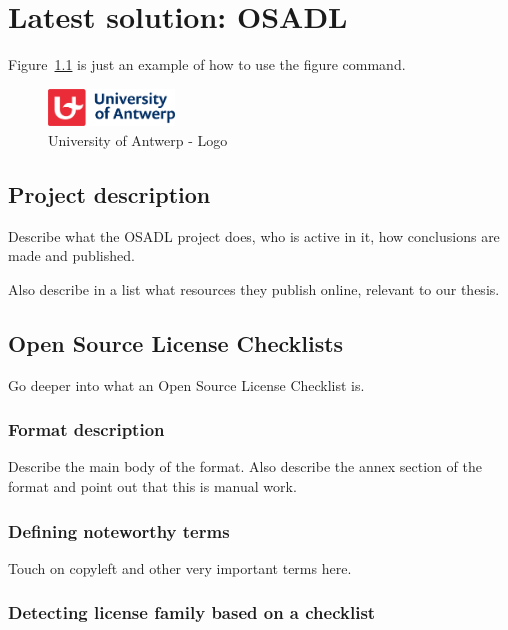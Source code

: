 
\chapter{Latest solution: OSADL}\label{ch:related-work}


Figure~\ref{fig:ua-logo} is just an example of how to use the figure command.
\begin{figure}[h]
	\centering
	\includegraphics[width=0.3\textwidth]{images/ua_logo_EN} 
	\caption{University of Antwerp - Logo}
	\label{fig:ua-logo}
\end{figure}


\section{Project description}

Describe what the OSADL project does, who is active in it, how conclusions are made and published.

Also describe in a list what resources they publish online, relevant to our thesis.

\section{Open Source License Checklists}

Go deeper into what an Open Source License Checklist is.

\subsection{Format description}

Describe the main body of the format. Also describe the annex section of the format and point out that this is manual work.

\subsection{Defining noteworthy terms}

Touch on copyleft and other very important terms here.

\subsection{Detecting license family based on a checklist}

\subsection{}

